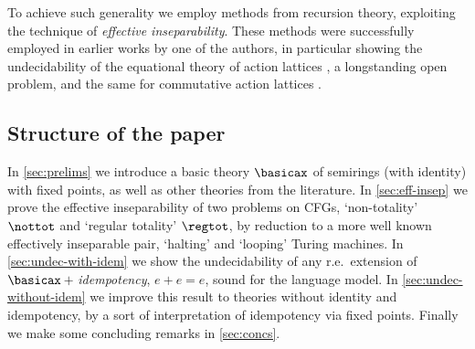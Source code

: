 \documentclass[runningheads]{amsart}
\begin{document}
To achieve such generality we employ methods from recursion theory, exploiting the technique of \emph{effective inseparability}. 
These methods were successfully employed in earlier works by one of the authors, in particular showing the undecidability of the equational theory of action lattices \cite{Kuznetsov19:action-logic,Kuznetsov2021TOCL}, a longstanding open problem, and the same for commutative action lattices \cite{Kuznetsov2023JLC}. %



\subsection{Structure of the paper}
In \cref{sec:prelims} we introduce a basic theory $\basicax$ of semirings (with identity) with fixed points, as well as other theories from the literature. 
In \cref{sec:eff-insep} we prove the effective inseparability of two problems on CFGs, `non-totality' $\nottot$ and `regular totality' $\regtot$, by reduction to a more well known effectively inseparable pair, `halting' and `looping' Turing machines.
In \cref{sec:undec-with-idem} we show the undecidability of any r.e.\ extension of $\basicax + {}$\emph{idempotency}, $e + e = e$, sound for the language model.
In \cref{sec:undec-without-idem} we improve this result to theories without identity and idempotency, by a sort of interpretation of idempotency via fixed points. 
Finally we make some concluding remarks in \cref{sec:concs}.

\newpage




\end{document}
